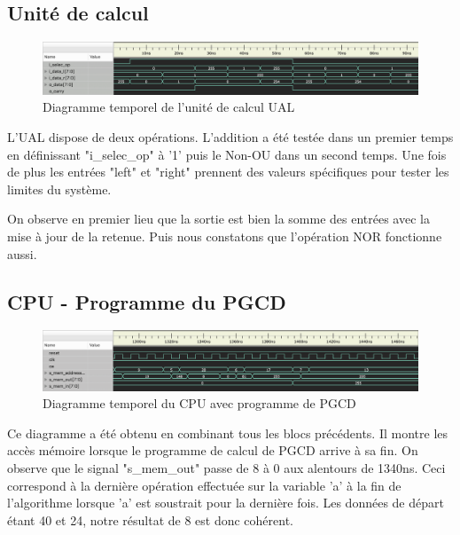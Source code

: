 \documentclass{article}
\begin{document}
    \subsection{Unité de calcul}
    \begin{figure}[h]
        \centering
        \includegraphics[width=\textwidth]{../doc/tb_screen/ual.png}
        \caption{Diagramme temporel de l'unité de calcul UAL}
        \label{fig:diag_tb_ual}
    \end{figure}
    \par L'UAL dispose de deux opérations. L'addition a été testée dans un premier temps en définissant "i\_selec\_op" à '1' puis le Non-OU dans un second temps. Une fois de plus les entrées "left" et "right" prennent des valeurs spécifiques pour tester les limites du système.
    \par On observe en premier lieu que la sortie est bien la somme des entrées avec la mise à jour de la retenue. Puis nous constatons que l'opération NOR fonctionne aussi.
    
    \subsection{CPU - Programme du PGCD}
    \begin{figure}[h]
        \centering
        \includegraphics[width=\textwidth]{../doc/tb_screen/cpu_2nd_prog.png}
        \caption{Diagramme temporel du CPU avec programme de PGCD}
        \label{fig:diag_tb_cpu_2nd_prog}
    \end{figure}
    \par Ce diagramme a été obtenu en combinant tous les blocs précédents. Il montre les accès mémoire lorsque le programme de calcul de PGCD arrive à sa fin. On observe que le signal "s\_mem\_out" passe de 8 à 0 aux alentours de 1340ns. Ceci correspond à la dernière opération effectuée sur la variable 'a' à la fin de l'algorithme lorsque 'a' est soustrait pour la dernière fois. Les données de départ étant 40 et 24, notre résultat de 8 est donc cohérent.  
\end{document}
